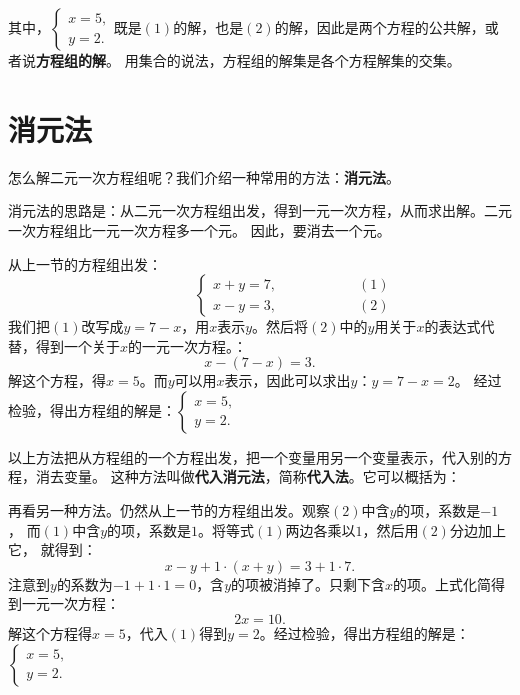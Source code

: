 \documentclass[12pt,UTF8]{ctexbook}
\begin{document}
其中，$\left\{ \begin{array}{c}
    x = 5, \\
    y = 2.
\end{array}\right.$既是$(1)$的解，也是$(2)$的解，因此是两个方程的公共解，或者说\textbf{方程组的解}。
用集合的说法，方程组的解集是各个方程解集的交集。

\section{消元法}
怎么解二元一次方程组呢？我们介绍一种常用的方法：\textbf{消元法}。

消元法的思路是：从二元一次方程组出发，得到一元一次方程，从而求出解。二元一次方程组比一元一次方程多一个元。
因此，要消去一个元。

从上一节的方程组出发：
$$ \quad \quad \quad \quad \quad\left\{
\begin{array}{cr}
     x + y = 7, & \quad \quad \quad \quad \quad (1) \\
     x - y = 3, & \quad \quad \quad \quad \quad (2)
\end{array}\right.
$$
我们把$(1)$改写成$y = 7 - x$，用$x$表示$y$。然后将$(2)$中的$y$用关于$x$的表达式代替，得到一个关于$x$的一元一次方程。：
$$ x - (7 - x) = 3.$$
解这个方程，得$x = 5$。而$y$可以用$x$表示，因此可以求出$y$：$y = 7 - x = 2$。
经过检验，得出方程组的解是：$\left\{ \begin{array}{c}
    x = 5, \\
    y = 2.
\end{array}\right.$

以上方法把从方程组的一个方程出发，把一个变量用另一个变量表示，代入别的方程，消去变量。
这种方法叫做\textbf{代入消元法}，简称\textbf{代入法}。它可以概括为：
\begin{center}
\end{center}

再看另一种方法。仍然从上一节的方程组出发。观察$(2)$中含$y$的项，系数是$-1$，
而$(1)$中含$y$的项，系数是$1$。将等式$(1)$两边各乘以$1$，然后用$(2)$分边加上它，
就得到：
$$ x - y + 1 \cdot (x + y) = 3 + 1 \cdot 7.$$
注意到$y$的系数为$-1 + 1 \cdot 1 = 0$，含$y$的项被消掉了。只剩下含$x$的项。上式化简得到一元一次方程：
$$ 2x = 10.$$
解这个方程得$x = 5$，代入$(1)$得到$y = 2$。经过检验，得出方程组的解是：$\left\{ \begin{array}{c}
    x = 5, \\
    y = 2.
\end{array}\right.$
\end{document}

